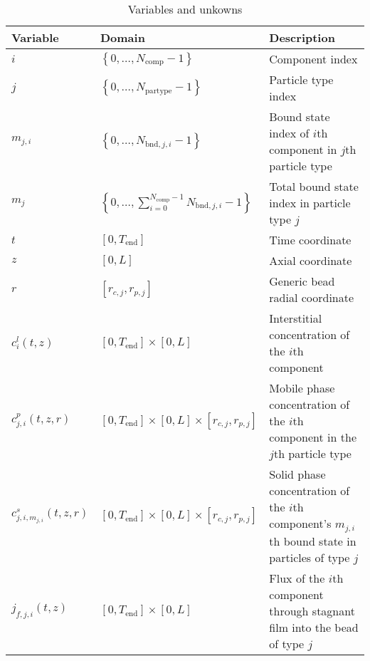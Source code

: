 \begin{table}[!hptb]
\centering
\begin{tabular}{llp{8cm}}
\toprule
Variable & Domain & Description \\
\midrule
$i$ & $\left\{ 0, \dots, N_{\text{comp}} - 1 \right\}$ & Component index\\
$j$ & $\left\{ 0, \dots, N_{\text{partype}} - 1 \right\}$ & Particle type index\\
$m_{j,i}$ & $\left\{ 0, \dots, N_{\text{bnd},j,i} - 1 \right\}$ & Bound state index of $i$th component in $j$th particle type\\
$m_j$ & $\left\{ 0, \dots, \sum_{i=0}^{N_{\text{comp}}-1} N_{\text{bnd},j,i} - 1 \right\}$ & Total bound state index in particle type $j$\\
$t$ & $\left[0, T_{\text{end}}\right]$ & Time coordinate\\
$z$ & $[0, L]$ & Axial coordinate\\
$r$ & $\left[r_{c,j}, r_{p,j}\right]$ & Generic bead radial coordinate\\
$c^l_{i}(t,z)$ & $\left[0, T_{\text{end}}\right] \times [0, L]$ & Interstitial concentration of the $i$th component\\
$c^p_{j,i}(t, z, r)$ & $\left[0, T_{\text{end}}\right] \times [0, L] \times \left[r_{c,j}, r_{p,j}\right]$ & Mobile phase concentration of the $i$th component in the $j$th particle type\\
$c^s_{j,i,m_{j,i}}(t, z, r)$ & $\left[0, T_{\text{end}}\right] \times [0,L] \times \left[r_{c,j}, r_{p,j}\right]$ & Solid phase concentration of the $i$th component's $m_{j,i}$th bound state in particles of type $j$\\
$j_{f,j,i}(t, z)$ & $\left[0, T_{\text{end}}\right] \times [0, L]$ & Flux of the $i$th component through stagnant film into the bead of type $j$\\
\bottomrule
\end{tabular}
\caption{Variables and unkowns}
\end{table}

